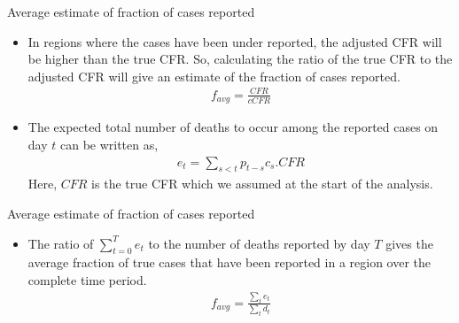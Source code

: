 \documentclass[10pt]{beamer}
\begin{document}
\begin{frame}{Average estimate of fraction of cases reported}
    \begin{itemize}
        \item In regions where the cases have been under reported, the adjusted CFR will be higher than the true CFR. So, calculating the ratio of the true CFR to the adjusted CFR will give an estimate of the fraction of cases reported.
\begin{align}
    f_{avg} = \frac{CFR}{cCFR}
\end{align}
\item The expected total number of deaths to occur among the reported cases on day $t$ can be written as,
\begin{align}
    e_t = \sum_{s<t}p_{t-s}c_{s}.CFR
\end{align}
Here, $CFR$ is the true CFR which we assumed at the start of the analysis.
    \end{itemize}
\end{frame}

\begin{frame}{Average estimate of fraction of cases reported}
    \begin{itemize}
\item The ratio of $\sum_{t=0}^{T}e_t$ to the number of deaths reported by day $T$ gives the average fraction of true cases that have been reported in a region over the complete time period.
\begin{align}
    f_{avg} = \frac{\sum_{t}e_t}{\sum_{t}d_t} 
\end{align}
    \end{itemize}
\end{frame}
\end{document}
